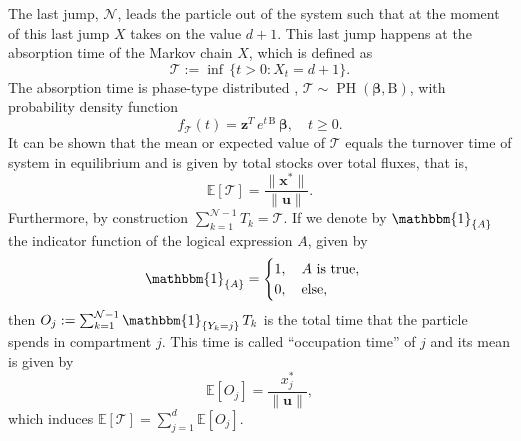 \documentclass[smallextended]{svjour3}
\makeatletter
\renewcommand*{\eqref}[1]{%
  \hyperref[{#1}]{\textup{\tagform@{\ref*{#1}}}}%
}
\renewcommand{\tens}[1]{\mathrm{#1}}
\renewcommand{\vec}[1]{\mathbf{#1}}
\newcommand{\E}{\mathbb{E}}
\newcommand{\TT}{\mathcal{T}}
\newcommand{\PH}{\operatorname{PH}}
\newcommand{\vnorms}[1]{\|#1\|}
\newcommand{\ie}{that is}
\newcommand{\pdf}{probability density function}
\renewcommand{\emph}[1]{``#1''}
\makeatother
\begin{document}
The last jump, $\mathcal{N}$, leads the particle out of the system such that at the moment of this last jump $X$ takes on the value $d+1$.
This last jump happens at the absorption time of the Markov chain $X$, which is defined as
\begin{equation}
   \TT := \inf\,\{t>0: X_t=d+1\}.
\end{equation}
The absorption time is phase-type distributed \citep{Neuts1981}, $\TT\sim\PH(\vec{\beta},\tens{B})$, with \pdf
\begin{equation}
  f_{\TT}(t) = \vec{z}^T\,e^{t\,\tens{B}}\,\vec{\beta},\quad t\geq0.
\end{equation}
It can be shown \citep[Sect.~3.2]{Metzler2018MGS} that the mean or expected value of $\TT$ equals the turnover time \citep{Sierra2017GCB} of system \eqref{eqn:lin_CS_sys} in equilibrium and is given by total stocks over total fluxes, \ie, 
\begin{equation}
  \E\left[\TT\right] = \frac{\vnorms{\vec{x}^\ast}}{\vnorms{\vec{u}}}.
\end{equation}
Furthermore, by construction $\sum_{k=1}^{\mathcal{N}-1} T_k = \TT$.
If we denote by $\mathbbm{1}_{\{A\}}$ the indicator function of the logical expression $A$, given by
\begin{equation}
  \mathbbm{1}_{\{A\}} =
  \begin{cases}
    1, \quad A\text{ is true},\\
    0, \quad\text{else},
  \end{cases}
\end{equation}
then $O_j:=\sum_{k=1}^{\mathcal{N}-1} \mathbbm{1}_{\{Y_k=j\}}\,T_k$ is the total time that the particle spends in compartment $j$.
This time is called \emph{occupation time} of $j$ and its mean is given by \citep[Sect.~3.3]{Metzler2018MGS}
\begin{equation}
  \label{eqn:occupation_time}
  \E\left[O_j\right] = \frac{x^\ast_j}{\vnorms{\vec{u}}},
\end{equation}
which induces $\E\left[\TT\right] = \sum_{j=1}^d \E\left[O_j\right]$.
\end{document}
